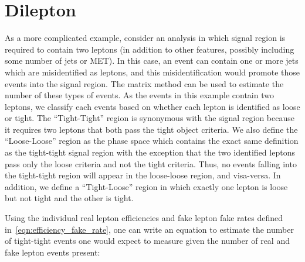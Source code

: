 \section{Dilepton}

As a more complicated example, consider an analysis in which signal region is required to contain two leptons
(in addition to other features, possibly including some number of jets or MET).
In this case, an event can contain one or more jets which are misidentified as leptons, and this misidentification would promote those events into the signal region.
The matrix method can be used to estimate the number of these types of events.
As the events in this example contain two leptons, we classify each events based on whether each lepton
is identified as loose or tight.
The ``Tight-Tight'' region is synonymous with the signal region because it requires two leptons that both pass the tight object criteria.
We also define the ``Loose-Loose'' region as the phase space which contains the exact same definition as the tight-tight signal region with the exception that the two identified leptons pass only the loose criteria and not the tight criteria.
Thus, no events falling into the tight-tight region will appear in the loose-loose region, and visa-versa.
In addition, we define a ``Tight-Loose'' region in which exactly one lepton is loose but not tight and the other is tight.

Using the individual real lepton efficiencies and fake lepton fake rates defined in~\ref{eqn:efficiency_fake_rate},
one can write an equation to estimate the number of tight-tight events one would expect to measure given
the number of real and fake lepton events present:



